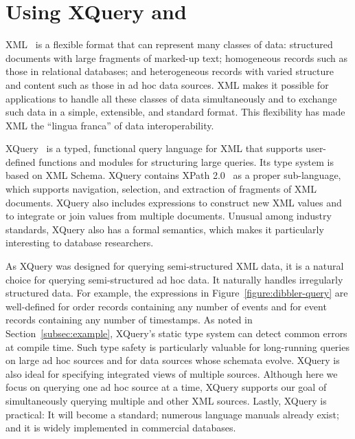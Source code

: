 \section{Using XQuery and \Galax{}}
\label{section:galax}

XML~\cite{xml10} is a flexible format that can represent many classes of
data: structured documents with large fragments of marked-up text;
homogeneous records such as those in relational databases; and
heterogeneous records with varied structure and content such as those
in ad hoc data sources.  XML makes it possible for applications to
handle all these classes of data simultaneously and to exchange such
data in a simple, extensible, and standard format.  This flexibility
has made XML the ``lingua franca'' of data
interoperability. 

XQuery~\cite{xquery10} is a typed, functional query language for XML
that supports user-defined functions and modules for structuring large
queries.  Its type system is based on XML Schema.  XQuery contains
XPath 2.0~\cite{xpath} as a proper sub-language, which supports
navigation, selection, and extraction of fragments of XML documents.
XQuery also includes expressions to construct new XML values and to
integrate or join values from multiple documents.  Unusual among
industry standards, XQuery also has a formal semantics, which makes it
particularly interesting to database researchers. 

As XQuery was designed for querying semi-structured XML data, it is a
natural choice for querying semi-structured ad hoc data.  It naturally
handles irregularly structured data.  For example, the expressions in
Figure~\ref{figure:dibbler-query} are well-defined for order records
containing any number of events and for event records containing any
number of timestamps.  As noted in Section~\ref{subsec:example},
XQuery's static type system can detect common errors at compile time.
Such type safety is particularly valuable for long-running queries on
large ad hoc sources and for data sources whose schemata evolve.
XQuery is also ideal for specifying integrated views of multiple
sources.  Although here we focus on querying one ad hoc source at a
time, XQuery supports our goal of simultaneously querying multiple
\pads{} and other XML sources. Lastly, XQuery is practical: It will
become a standard; numerous language manuals already exist; and it is
widely implemented in commercial databases.

